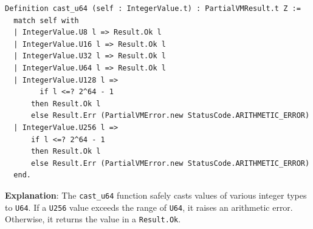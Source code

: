\documentclass[english, 12pt, a4paper, biz, utf8, a-2b, online]{aaltothesis}
\begin{document}
\begin{tcolorbox}[
  colback=white,     %
  colframe=white,    %
  boxrule=0pt,       %
  sharp corners,     %
  boxsep=0pt,        %
  left=0pt,          %
  right=0pt,         %
  top=0pt,           %
  bottom=0pt         %
]
\begin{lstlisting}[caption={Casting to \texttt{u64} with \texttt{cast\_u64}},captionpos=b]
Definition cast_u64 (self : IntegerValue.t) : PartialVMResult.t Z :=
  match self with
  | IntegerValue.U8 l => Result.Ok l
  | IntegerValue.U16 l => Result.Ok l
  | IntegerValue.U32 l => Result.Ok l
  | IntegerValue.U64 l => Result.Ok l
  | IntegerValue.U128 l =>
        if l <=? 2^64 - 1
      then Result.Ok l
      else Result.Err (PartialVMError.new StatusCode.ARITHMETIC_ERROR)
  | IntegerValue.U256 l =>
      if l <=? 2^64 - 1
      then Result.Ok l
      else Result.Err (PartialVMError.new StatusCode.ARITHMETIC_ERROR)
  end.
\end{lstlisting}
\end{tcolorbox}




\textbf{Explanation}: The \texttt{cast\_u64} function safely casts values of various integer types to \texttt{U64}. If a \texttt{U256} value exceeds the range of \texttt{U64}, it raises an arithmetic error. Otherwise, it returns the value in a \texttt{Result.Ok}.

\clearpage

\end{document}
